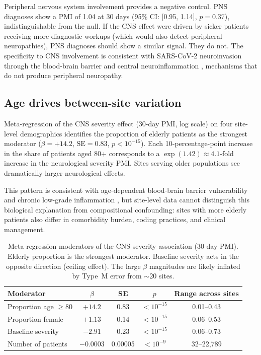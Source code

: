 \documentclass{article}
\begin{document}
Peripheral nervous system involvement provides a negative control.  PNS
diagnoses show a PMI of 1.04 at 30 days (95\% CI: [0.95, 1.14],
$p = 0.37$), indistinguishable from the null.  If the CNS effect were
driven by sicker patients receiving more diagnostic workups (which would
also detect peripheral neuropathies), PNS diagnoses should show a similar
signal.  They do not.  The specificity to CNS involvement is consistent
with SARS-CoV-2 neuroinvasion through the blood-brain barrier
\cite{song2021neuroinvasion} and central neuroinflammation
\cite{iadecola2020covid}, mechanisms that do not produce peripheral
neuropathy.


\subsection{Age drives between-site variation}

Meta-regression of the CNS severity effect (30-day PMI, log scale) on four
site-level demographics identifies the proportion of elderly patients as the
strongest moderator ($\beta = +14.2$, $\text{SE} = 0.83$,
$p < 10^{-15}$).  Each 10-percentage-point increase in the share of
patients aged 80+ corresponds to a $\exp(1.42) \approx 4.1$-fold increase
in the neurological severity PMI.  Sites serving older populations see
dramatically larger neurological effects.

This pattern is consistent with age-dependent blood-brain barrier
vulnerability \cite{montagne2015bbb} and chronic low-grade inflammation
\cite{franceschi2018inflammaging}, but site-level data cannot distinguish
this biological explanation from compositional confounding: sites with more
elderly patients also differ in comorbidity burden, coding practices, and
clinical management.

\begin{table}[t]
\centering
\caption{Meta-regression moderators of the CNS severity association (30-day
PMI).  Elderly proportion is the strongest moderator.  Baseline severity
acts in the opposite direction (ceiling effect).  The large $\beta$
magnitudes are likely inflated by Type~M error \cite{gelman2014typeMS} from
$\sim$20 sites.}
\label{tab:moderators}
\begin{tabular}{lcccc}
\toprule
Moderator & $\beta$ & SE & $p$ & Range across sites \\
\midrule
Proportion age $\geq 80$ & $+14.2$ & 0.83 & $< 10^{-15}$ & 0.01--0.43 \\
Proportion female & $+1.13$ & 0.14 & $< 10^{-15}$ & 0.06--0.53 \\
Baseline severity & $-2.91$ & 0.23 & $< 10^{-15}$ & 0.06--0.73 \\
Number of patients & $-0.0003$ & 0.00005 & $< 10^{-9}$ & 32--22{,}789 \\
\bottomrule
\end{tabular}
\end{table}
\end{document}
